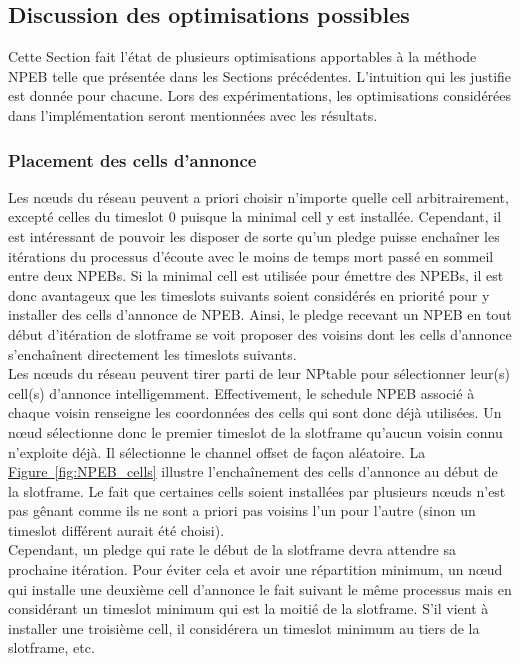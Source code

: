 \documentclass[]{report}
\newcommand{\wordlink}[2]{\hyperref[#2]{#1~\ref{#2}}}
\begin{document}
\subsection{Discussion des optimisations possibles}
\label{optis_NPEB}

Cette Section fait l'état de plusieurs optimisations apportables à la méthode NPEB telle que présentée dans les Sections précédentes. L'intuition qui les justifie est donnée pour chacune. Lors des expérimentations, les optimisations considérées dans l'implémentation seront mentionnées avec les résultats.

\subsubsection{Placement des cells d'annonce}

Les nœuds du réseau peuvent a priori choisir n'importe quelle cell arbitrairement, excepté celles du timeslot 0 puisque la minimal cell y est installée. Cependant, il est intéressant de pouvoir les disposer de sorte qu'un pledge puisse enchaîner les itérations du processus d'écoute avec le moins de temps mort passé en sommeil entre deux NPEBs. Si la minimal cell est utilisée pour émettre des NPEBs, il est donc avantageux que les timeslots suivants soient considérés en priorité pour y installer des cells d'annonce de NPEB. Ainsi, le pledge recevant un NPEB en tout début d'itération de slotframe se voit proposer des voisins dont les cells d'annonce s'enchaînent directement les timeslots suivants.\\

Les nœuds du réseau peuvent tirer parti de leur NPtable pour sélectionner leur(s) cell(s) d'annonce intelligemment. Effectivement, le schedule NPEB associé à chaque voisin renseigne les coordonnées des cells qui sont donc déjà utilisées. Un nœud sélectionne donc le premier timeslot de la slotframe qu'aucun voisin connu n'exploite déjà. Il sélectionne le channel offset de façon aléatoire. La \wordlink{Figure}{fig:NPEB_cells} illustre l'enchaînement des cells d'annonce au début de la slotframe. Le fait que certaines cells soient installées par plusieurs nœuds n'est pas gênant comme ils ne sont a priori pas voisins l'un pour l'autre (sinon un timeslot différent aurait été choisi).\\

Cependant, un pledge qui rate le début de la slotframe devra attendre sa prochaine itération. Pour éviter cela et avoir une répartition minimum, un nœud qui installe une deuxième cell d'annonce le fait suivant le même processus mais en considérant un timeslot minimum qui est la moitié de la slotframe. S'il vient à installer une troisième cell, il considérera un timeslot minimum au tiers de la slotframe, etc.
\end{document}
